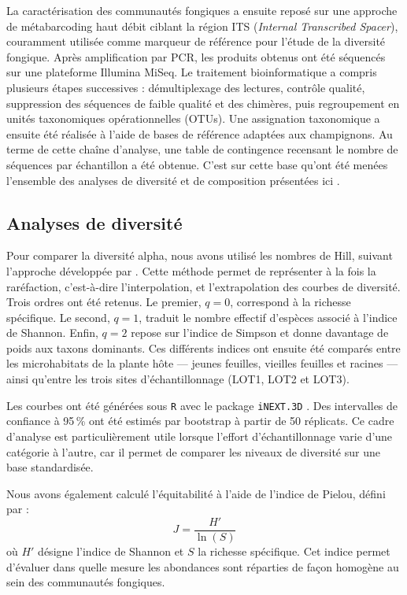 \documentclass[alpha-refs,twocolumn]{wiley-article}
\begin{document}
La caractérisation des communautés fongiques a ensuite reposé sur une approche de métabarcoding haut débit ciblant la région ITS (\textit{Internal Transcribed Spacer}), couramment utilisée comme marqueur de référence pour l’étude de la diversité fongique. Après amplification par PCR, les produits obtenus ont été séquencés sur une plateforme Illumina MiSeq. Le traitement bioinformatique a compris plusieurs étapes successives : démultiplexage des lectures, contrôle qualité, suppression des séquences de faible qualité et des chimères, puis regroupement en unités taxonomiques opérationnelles (OTUs). Une assignation taxonomique a ensuite été réalisée à l’aide de bases de référence adaptées aux champignons. Au terme de cette chaîne d’analyse, une table de contingence recensant le nombre de séquences par échantillon a été obtenue. C’est sur cette base qu’ont été menées l’ensemble des analyses de diversité et de composition présentées ici \citep{leponce2024unveiling}.


\subsection{Analyses de diversité}

Pour comparer la diversité alpha, nous avons utilisé les nombres de Hill, suivant l’approche développée par \citet{chao2014rarefaction}. Cette méthode permet de représenter à la fois la raréfaction, c’est-à-dire l’interpolation, et l’extrapolation des courbes de diversité. Trois ordres ont été retenus. Le premier, \(q=0\), correspond à la richesse spécifique. Le second, \(q=1\), traduit le nombre effectif d’espèces associé à l’indice de Shannon. Enfin, \(q=2\) repose sur l’indice de Simpson et donne davantage de poids aux taxons dominants. Ces différents indices ont ensuite été comparés entre les microhabitats de la plante hôte — jeunes feuilles, vieilles feuilles et racines — ainsi qu’entre les trois sites d’échantillonnage (LOT1, LOT2 et LOT3).

Les courbes ont été générées sous \texttt{R} avec le package \texttt{iNEXT.3D} \citep{chao2021measuring}. Des intervalles de confiance à 95\,\% ont été estimés par bootstrap à partir de 50 réplicats. Ce cadre d’analyse est particulièrement utile lorsque l’effort d’échantillonnage varie d’une catégorie à l’autre, car il permet de comparer les niveaux de diversité sur une base standardisée.

Nous avons également calculé l’équitabilité à l’aide de l’indice de Pielou, défini par :
\[ J = \frac{H'}{\ln(S)} \]
où \(H'\) désigne l’indice de Shannon et \(S\) la richesse spécifique. Cet indice permet d’évaluer dans quelle mesure les abondances sont réparties de façon homogène au sein des communautés fongiques.
\end{document}
